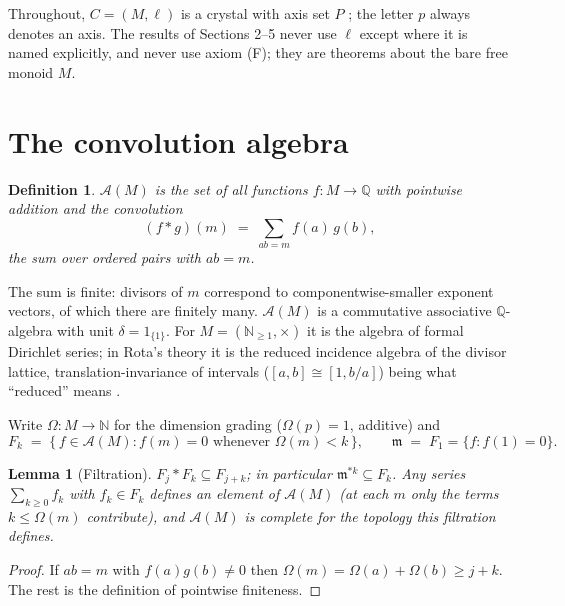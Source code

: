 \documentclass[11pt]{article}
\newtheorem{definition}{Definition}
\newtheorem{lemma}{Lemma}
\theoremstyle{remark}
\newcommand{\N}{\mathbb{N}}
\newcommand{\Q}{\mathbb{Q}}
\newcommand{\m}{\mathfrak{m}}
\newcommand{\A}{\mathcal{A}}
\begin{document}
Throughout, $C = (M, \ell)$ is a crystal with axis set $P$ \cite{Defs}; the letter $p$ always
denotes an axis. The results of Sections 2--5 never use $\ell$ except where it is named
explicitly, and never use axiom (F); they are theorems about the bare free monoid $M$.

\section{The convolution algebra}

\begin{definition}
$\A(M)$ is the set of all functions $f \colon M \to \Q$ with pointwise addition and the convolution
\[
(f * g)(m) \;=\; \sum_{ab = m} f(a)\, g(b),
\]
the sum over ordered pairs with $ab = m$.
\end{definition}

The sum is finite: divisors of $m$ correspond to componentwise-smaller exponent vectors, of which
there are finitely many. $\A(M)$ is a commutative associative $\Q$-algebra with unit
$\delta = 1_{\{1\}}$. For $M = (\N_{\ge 1}, \times)$ it is the algebra of formal Dirichlet series;
in Rota's theory it is the reduced incidence algebra of the divisor lattice, translation-invariance
of intervals ($[a, b] \cong [1, b/a]$) being what ``reduced'' means \cite{Rota, DRS, StanleyEC}.

Write $\Omega \colon M \to \N$ for the dimension grading ($\Omega(p) = 1$, additive) and
\[
F_k \;=\; \{\, f \in \A(M) : f(m) = 0 \text{ whenever } \Omega(m) < k \,\}, \qquad
\m \;=\; F_1 = \{ f : f(1) = 0 \}.
\]

\begin{lemma}[Filtration]\label{lem:filt}
$F_j * F_k \subseteq F_{j+k}$; in particular $\m^{*k} \subseteq F_k$. Any series
$\sum_{k \ge 0} f_k$ with $f_k \in F_k$ defines an element of $\A(M)$ (at each $m$ only the terms
$k \le \Omega(m)$ contribute), and $\A(M)$ is complete for the topology this filtration defines.
\end{lemma}

\begin{proof}
If $ab = m$ with $f(a) g(b) \ne 0$ then $\Omega(m) = \Omega(a) + \Omega(b) \ge j + k$. The rest is
the definition of pointwise finiteness.
\end{proof}
\end{document}
